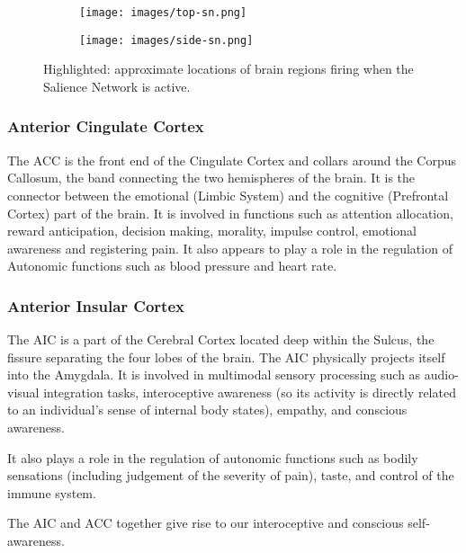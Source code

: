 \documentclass[a4paper, amsfonts, amssymb, amsmath, reprint, showkeys, nofootinbib, twoside]{revtex4-1}
\begin{document}
\begin{figure}[h!]
  \centering
  \begin{subfigure}[b]{0.48\linewidth}
    \texttt{[image: images/top-sn.png]}
  \end{subfigure}
  \begin{subfigure}[b]{0.48\linewidth}
    \texttt{[image: images/side-sn.png]}
  \end{subfigure}
  \caption{Highlighted: approximate locations of brain regions firing when the Salience Network is active.}
  \label{fig:sn}
\end{figure}

\subsubsection{Anterior Cingulate Cortex}

The ACC is the front end of the Cingulate Cortex and collars around the Corpus
Callosum, the band connecting the two hemispheres of the brain. It is the connector
between the emotional (Limbic System) and the cognitive (Prefrontal Cortex) part of
the brain. It is involved in functions such as attention allocation, reward
anticipation, decision making, morality, impulse control, emotional awareness and
registering pain. \cite{accstroop,accreward,snmorality,empathypain,acccognitive} It
also appears to play a role in the regulation of Autonomic functions such as blood
pressure and heart rate. \cite{accbloodpressure}

\subsubsection{Anterior Insular Cortex}

The AIC is a part of the Cerebral Cortex located deep within the Sulcus, the
fissure separating the four lobes of the brain. The AIC physically projects itself
into the Amygdala. It is involved in multimodal sensory processing such as
audio-visual integration tasks, interoceptive awareness (so its activity is directly
related to an individual's sense of internal body states), empathy, and conscious
awareness. \cite{aicemotion}

It also plays a role in the regulation of autonomic functions such as bodily
sensations (including judgement of the severity of pain), taste, and control of the
immune system. \cite{aicautonomic}

The AIC and ACC together give rise to our interoceptive and conscious
self-awareness.  \cite{selfaware}
\end{document}
